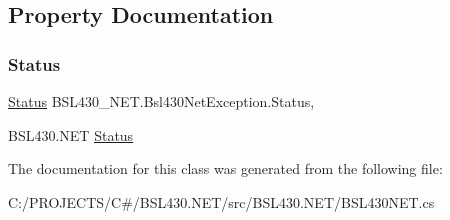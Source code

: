 \subsection{Property Documentation}
\mbox{\label{class_b_s_l430___n_e_t_1_1_bsl430_net_exception_a9252354e812bcd9fc4d537c74335b4a1}} 
\subsubsection{\texorpdfstring{Status}{Status}}
{\footnotesize\ttfamily \mbox{\hyperlink{class_b_s_l430___n_e_t_1_1_status}{Status}} B\+S\+L430\+\_\+\+N\+E\+T.\+Bsl430\+Net\+Exception.\+Status\hspace{0.3cm}{\ttfamily [get]}, {\ttfamily [set]}}



B\+S\+L430.\+N\+ET \mbox{\hyperlink{class_b_s_l430___n_e_t_1_1_status}{Status}} 



The documentation for this class was generated from the following file\+:\begin{DoxyCompactItemize}
\item 
C\+:/\+P\+R\+O\+J\+E\+C\+T\+S/\+C\#/\+B\+S\+L430.\+N\+E\+T/src/\+B\+S\+L430.\+N\+E\+T/B\+S\+L430\+N\+E\+T.\+cs\end{DoxyCompactItemize}
